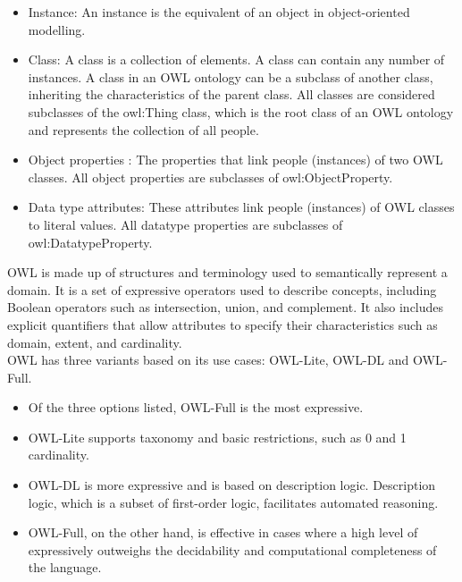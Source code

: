             \begin{itemize}
                \item Instance: An instance is the equivalent of an object in object-oriented modelling. 
                \item Class: A class is a collection of elements. A class can contain any number of instances. A class in an OWL ontology can be a subclass of another class, inheriting the characteristics of the parent class. All classes are considered subclasses of the owl:Thing class, which is the root class of an OWL ontology and represents the collection of all people. 
                \item Object properties : The properties that link people (instances) of two OWL classes. All object properties are subclasses of owl:ObjectProperty. 
                \item Data type attributes: These attributes link people (instances) of OWL classes to literal values. All datatype properties are subclasses of owl:DatatypeProperty.
            \end{itemize}
        
            OWL is made up of structures and terminology used to semantically represent a domain. It is a set of expressive operators used to describe concepts, including Boolean operators such as intersection, union, and complement. It also includes explicit quantifiers that allow attributes to specify their characteristics such as domain, extent, and cardinality.\\
        
            OWL has three variants based on its use cases: OWL-Lite, OWL-DL and OWL-Full. 
        
            \begin{itemize}
                \item Of the three options listed, OWL-Full is the most expressive. 
                \item OWL-Lite supports taxonomy and basic restrictions, such as 0 and 1 cardinality. 
                \item OWL-DL is more expressive and is based on description logic. Description logic, which is a subset of first-order logic, facilitates automated reasoning. 
                \item OWL-Full, on the other hand, is effective in cases where a high level of expressively outweighs the decidability and computational completeness of the language.
            \end{itemize}


